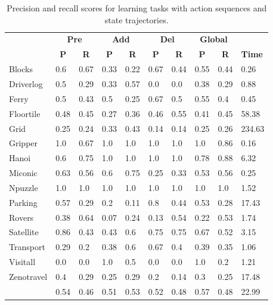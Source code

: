 \begin{table}[hbt!]
  \begin{center}
    \begin{footnotesize}
		\begin{tabular}{l|l|l|l|l|l|l||l|l||l|}
			& \multicolumn{2}{|c|}{\bf Pre} & \multicolumn{2}{|c|}{\bf Add} & \multicolumn{2}{|c||}{\bf Del} & \multicolumn{2}{|c|}{\bf Global} & \\ \cline{2-9}			
			& \multicolumn{1}{|c|}{\bf P} & \multicolumn{1}{|c|}{\bf R} & \multicolumn{1}{|c|}{\bf P} & \multicolumn{1}{|c|}{\bf R} & \multicolumn{1}{|c|}{\bf P} & \multicolumn{1}{|c||}{\bf R} &  \multicolumn{1}{|c|}{\bf P} & \multicolumn{1}{|c|}{\bf R} & {\bf Time} \\
			\hline
			Blocks & 0.6 & 0.67 & 0.33 & 0.22 & 0.67 & 0.44 & 0.55 & 0.44& 0.26 \\ 
			Driverlog & 0.5 & 0.29 & 0.33 & 0.57 & 0.0 & 0.0 & 0.38 & 0.29& 0.88 \\
			Ferry & 0.5 & 0.43 & 0.5 & 0.25 & 0.67 & 0.5 & 0.55 & 0.4& 0.45 \\ 
			Floortile & 0.48 & 0.45 & 0.27 & 0.36 & 0.46 & 0.55 & 0.41 & 0.45& 58.38 \\
			Grid & 0.25 & 0.24 & 0.33 & 0.43 & 0.14 & 0.14 & 0.25 & 0.26& 234.63 \\ 
			Gripper & 1.0 & 0.67 & 1.0 & 1.0 & 1.0 & 1.0 & 1.0 & 0.86& 0.16 \\ 
			Hanoi & 0.6 & 0.75 & 1.0 & 1.0 & 1.0 & 1.0 & 0.78 & 0.88& 6.32 \\ 
			Miconic & 0.63 & 0.56 & 0.6 & 0.75 & 0.25 & 0.33 & 0.53 & 0.56& 0.25 \\ 
			Npuzzle & 1.0 & 1.0 & 1.0 & 1.0 & 1.0 & 1.0 & 1.0 & 1.0& 1.52 \\ 
			Parking & 0.57 & 0.29 & 0.2 & 0.11 & 0.8 & 0.44 & 0.53 & 0.28& 17.43 \\
			Rovers & 0.38 & 0.64 & 0.07 & 0.24 & 0.13 & 0.54 & 0.22 & 0.53& 1.74 \\
			Satellite & 0.86 & 0.43 & 0.43 & 0.6 & 0.75 & 0.75 & 0.67 & 0.52& 3.15 \\
			Transport & 0.29 & 0.2 & 0.38 & 0.6 & 0.67 & 0.4 & 0.39 & 0.35& 1.06 \\
			Visitall & 0.0 & 0.0 & 1.0 & 0.5 & 0.0 & 0.0 & 1.0 & 0.2& 1.21 \\ 
			Zenotravel & 0.4 & 0.29 & 0.25 & 0.29 & 0.2 & 0.14 & 0.3 & 0.25& 17.48 \\ 			
			\hline
			\bf & 0.54 & 0.46 & 0.51 & 0.53 & 0.52 & 0.48 & 0.57 & 0.48 & 22.99
		\end{tabular}
            \end{footnotesize}
	\end{center}
	\caption{\small Precision and recall scores for learning tasks with \NO action sequences and \NO state trajectories.}
	\label{tab:results_minimum_0_0}
\end{table}


